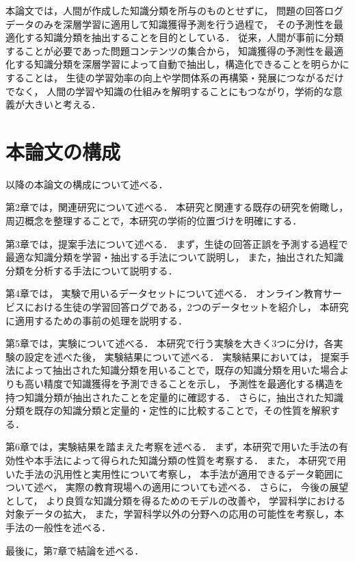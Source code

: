 本論文では，人間が作成した知識分類を所与のものとせずに，
問題の回答ログデータのみを深層学習に適用して知識獲得予測を行う過程で，
その予測性を最適化する知識分類を抽出することを目的としている．
従来，人間が事前に分類することが必要であった問題コンテンツの集合から，
知識獲得の予測性を最適化する知識分類を深層学習によって自動で抽出し，構造化できることを明らかにすることは，
生徒の学習効率の向上や学問体系の再構築・発展につながるだけでなく，
人間の学習や知識の仕組みを解明することにもつながり，学術的な意義が大きいと考える．


\section{本論文の構成}
以降の本論文の構成について述べる．

\vvspace

第2章では，関連研究について述べる．
本研究と関連する既存の研究を俯瞰し，
周辺概念を整理することで，本研究の学術的位置づけを明確にする．

\vvspace

第3章では，提案手法について述べる．
まず，生徒の回答正誤を予測する過程で最適な知識分類を学習・抽出する手法について説明し，
また，抽出された知識分類を分析する手法について説明する．

\vvspace

第4章では，
実験で用いるデータセットについて述べる．
オンライン教育サービスにおける生徒の学習回答ログである，2つのデータセットを紹介し，
本研究に適用するための事前の処理を説明する．

\vvspace

第5章では，実験について述べる．
本研究で行う実験を大きく3つに分け，各実験の設定を述べた後，
実験結果について述べる．
実験結果においては，
提案手法によって抽出された知識分類を用いることで，既存の知識分類を用いた場合よりも高い精度で知識獲得を予測できることを示し，
予測性を最適化する構造を持つ知識分類が抽出されたことを定量的に確認する．
さらに，抽出された知識分類を既存の知識分類と定量的・定性的に比較することで，その性質を解釈する．

\vvspace

第6章では，実験結果を踏まえた考察を述べる．
まず，本研究で用いた手法の有効性や本手法によって得られた知識分類の性質を考察する．
また，
本研究で用いた手法の汎用性と実用性について考察し，
本手法が適用できるデータ範囲について述べ，
実際の教育現場への適用についても述べる．
さらに，
今後の展望として，
より良質な知識分類を得るためのモデルの改善や，
学習科学における対象データの拡大，
また，学習科学以外の分野への応用の可能性を考察し，本手法の一般性を述べる．

\vvspace

最後に，第7章で結論を述べる．
